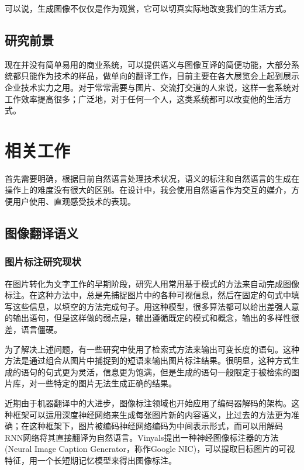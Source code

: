 可以说，生成图像不仅仅是作为观赏，它可以切真实际地改变我们的生活方式。

\subsection{研究前景}
现在并没有简单易用的商业系统，可以提供语义与图像互译的简便功能，大部分系统都只能作为技术的样品，做单向的翻译工作，目前主要在各大展览会上起到展示企业技术实力之用。对于常常需要与图片、交流打交道的人来说，这样一套系统对工作效率提高很多；广泛地，对于任何一个人，这类系统都可以改变他的生活方式。

\section{相关工作}
首先需要明确，根据目前自然语言处理技术状况，语义的标注和自然语言的生成在操作上的难度没有很大的区别。在设计中，我会使用自然语言作为交互的媒介，方便用户使用、直观感受技术的表现。

\subsection{图像翻译语义}
\subsubsection{图片标注研究现状}
在图片转化为文字工作的早期阶段，研究人用常用基于模式的方法来自动完成图像标注。在这种方法中，总是先捕捉图片中的各种可视信息，然后在固定的句式中填写这些信息，以填空的方法完成句子。用这种模型，很多算法都可以给出差强人意的输出语句，但是这样做的弱点是，输出遵循既定的模式和概念，输出的多样性很差，语言僵硬。

为了解决上述问题，有一些研究中使用了检索式方法来输出可变长度的语句。这种方法是通过组合从图片中捕捉到的短语来输出图片标注结果。很明显，这种方式生成的语句的句式更为灵活，信息更为饱满，但是生成的语句一般限定于被检索的图片库，对一些特定的图片无法生成正确的结果。

近期由于机器翻译中的大进步，图像标注领域也开始应用了编码器解码的架构。这种框架可以运用深度神经网络来生成每张图片新的内容语义，比过去的方法更为准确；在这种框架下，图片被编码神经网络编码为中间表示形式，而可以用解码RNN网络将其直接翻译为自然语言。Vinyals提出一种神经图像标注器的方法(Neural Image Caption Generator，称作Google NIC)，可以提取目标图片的可视特征，用一个长短期记忆模型来得出图像标注。

